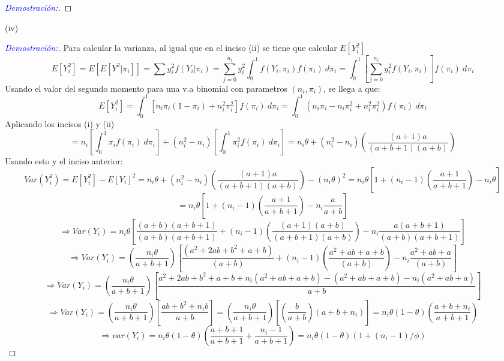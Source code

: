 \documentclass[12pt,a4paper,oneside]{article}
\begin{document}
\begin{compactenum}
\begin{proof}[\textcolor{blue}{Demostración:}]
	\end{proof}
	
	\item[(iv)] \begin{proof}[\textcolor{blue}{Demostración:}] Para calcular la varianza, al igual que en el inciso (ii) se tiene que calcular $E[Y_i^2]$
	$$E[Y_i^2] = E[E[Y^2 | \pi_i]] = \sum y_i^2 f(Y_i | \pi_i) = \sum_{j = 0}^{n_i} y_i^2 \int_0^1 f(Y_i, \pi_i) f(\pi_i) \ d\pi_i = \int_0^1 \left[ \sum_{j = 0}^{n_i} y_i^2 f(Y_i, \pi_i) \right] f(\pi_i) \ d\pi_i$$
	Usando el valor del segundo momento para una v.a binomial con parametros $(n_i, \pi_i)$, se llega a que:
	$$E[Y_i^2] = \int_0^1 [n_i \pi_i(1 - \pi_i) + n_i^2 \pi_i^2] f(\pi_i) \ d\pi_i = \int_0^1 (n_i \pi_i - n_i \pi_i^2 + n_i^2 \pi_i^2) f(\pi_i) \ d\pi_i $$
	Aplicando los incisos (i) y (ii)
	$$= n_i \left[ \int_0^1 \pi_i f(\pi_i) \ d\pi_i \right] + (n_i^2 - n_i) \left[ \int_0^1 \pi_i^2 f(\pi_i) \ d\pi_i \right] = n_i \theta + (n_i^2 - n_i) \left(\frac{(a + 1)a}{(a + b + 1)(a + b)} \right)$$
	Usando esto y el inciso anterior:
	$$Var(Y_i^2) = E[Y_i^2] - E[Y_i]^2 = n_i \theta + (n_i^2 - n_i) \left(\frac{(a + 1)a}{(a + b + 1)(a + b)} \right) - (n_i \theta)^2 = n_i \theta \left[1 + (n_i - 1) \left(\frac{a + 1}{a + b + 1} \right) - n_i \theta \right] $$
	$$= n_i \theta \left[1 + (n_i - 1) \left(\frac{a + 1}{a + b + 1} \right) - n_i \frac{a}{a + b} \right] $$
	$$\Rightarrow Var(Y_i)= n_i \theta \left[\frac{(a + b)(a + b + 1)}{(a + b)(a + b + 1)} + (n_i - 1) \left(\frac{(a + 1)(a + b)}{(a + b + 1)(a + b)} \right) - n_i \frac{a(a + b + 1)}{(a + b)(a + b + 1)} \right]$$
	$$\Rightarrow Var(Y_i) = \left( \frac{n_i \theta}{a + b + 1} \right) \left[\frac{(a^2 + 2ab + b^2 + a + b)}{(a + b)} + (n_i - 1) \left(\frac{a^2 + ab + a + b}{(a + b)} \right) - n_i \frac{a^2 + ab + a}{(a + b)} \right]$$
	$$\Rightarrow Var(Y_i) = \left( \frac{n_i \theta}{a + b + 1} \right) \left[ \frac{a^2 + 2ab + b^2 + a + b + n_i (a^2 + ab + a + b) - (a^2 + ab + a + b) -n_i (a^2 + ab + a)}{a+b} \right]$$
	$$\Rightarrow Var(Y_i) = \left( \frac{n_i \theta}{a + b + 1} \right) \left[ \frac{ab + b^2 + n_i b}{a+b} \right] = \left( \frac{n_i \theta}{a + b + 1} \right) \left[\left( \frac{b}{a + b} \right) (a + b + n_i) \right] = n_i \theta (1 - \theta) \left(\frac{a + b + n_i}{a + b + 1} \right)$$
	$$\Rightarrow var(Y_i) = n_i \theta (1 - \theta) \left( \frac{a + b +1}{a + b + 1} + \frac{n_i - 1}{a + b +1} \right) = n_i \theta (1 - \theta)(1 + (n_i - 1) / \phi)$$
	\end{proof}
\end{compactenum} 
 
\end{document}
